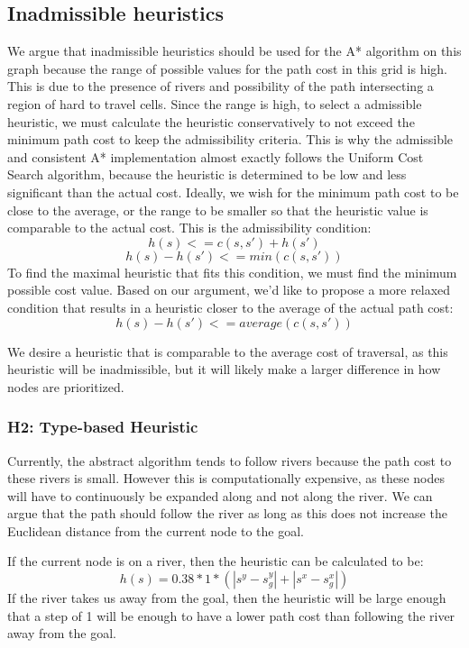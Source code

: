 \subsection{Inadmissible heuristics}
We argue that inadmissible heuristics should be used for the A* algorithm on this graph because the range of possible values for the path cost in this grid is high. This is due to the presence of rivers and possibility of the path intersecting a region of hard to travel cells. Since the range is high, to select a admissible heuristic, we must calculate the heuristic conservatively to not exceed the minimum path cost to keep the admissibility criteria. This is why the admissible and consistent A* implementation almost exactly follows the Uniform Cost Search algorithm, because the heuristic is determined to be low and less significant than the actual cost. Ideally, we wish for the minimum path cost to be close to the average, or the range to be smaller so that the heuristic value is comparable to the actual cost.
This is the admissibility condition:
\[h(s) <= c(s,s') + h(s') \]
\[h(s) - h(s') <= min(c(s,s'))\]
To find the maximal heuristic that fits this condition, we must find the minimum possible cost value.
Based on our argument, we'd like to propose a more relaxed condition that results in a heuristic closer to the average of the actual path cost:
\[h(s) - h(s') <= average(c(s,s'))\]

We desire a heuristic that is comparable to the average cost of traversal, as this heuristic will be inadmissible, but it will likely make a larger difference in how nodes are prioritized.


\subsubsection{H2: Type-based Heuristic}
Currently, the abstract algorithm tends to follow rivers because the path cost to these rivers is small. However this is computationally expensive, as these nodes will have to continuously be expanded along and not along the river. We can argue that the path should follow the river as long as this does not increase the Euclidean distance from the current node to the goal.

If the current node is on a river, then the heuristic can be calculated to be:
\[h(s) = 0.38 * 1 * ( |s^y - s_g^y| + |s^x - s_g^x| )\]
If the river takes us away from the goal, then the heuristic will be large enough that a step of 1 will be enough to have a lower path cost than following the river away from the goal.

